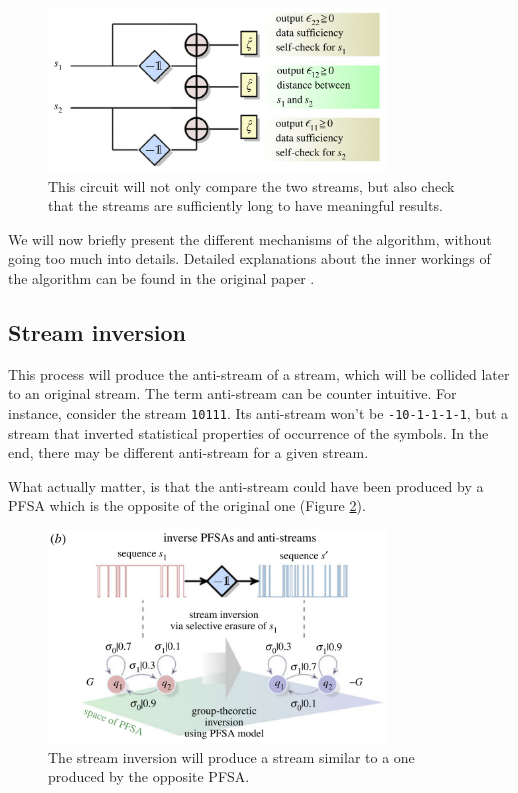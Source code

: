 	\begin{figure}[h]
		\begin{center}
			\includegraphics[width=0.8\textwidth]{figures/circuit.png}
		\end{center}
		\caption{This circuit will not only compare the two streams, but also check that the streams are sufficiently long to have meaningful results.}
		\label{fig:circuit}
	\end{figure}


	We will now briefly present the different mechanisms of the algorithm, without going too much into details.
	Detailed explanations about the inner workings of the algorithm can be found in the original paper \cite{data_smashing}.

	\subsection{Stream inversion}
		This process will produce the anti-stream of a stream, which will be collided later to an original stream. 
		The term anti-stream can be counter intuitive. 
		For instance, consider the stream \verb|10111|. Its anti-stream won't be \verb|-10-1-1-1-1|, but a stream that inverted statistical properties of occurrence of the symbols.
		In the end, there may be different anti-stream for a given stream.

		What actually matter, is that the anti-stream could have been produced by a PFSA which is the opposite of the original one (Figure \ref{fig:inversion}).

		\begin{figure}[h]
			\begin{center}
				\includegraphics[width=0.8\textwidth]{figures/inversion.png}
			\end{center}
			\caption{The stream inversion will produce a stream similar to a one produced by the opposite PFSA.}
			\label{fig:inversion}
		\end{figure}

